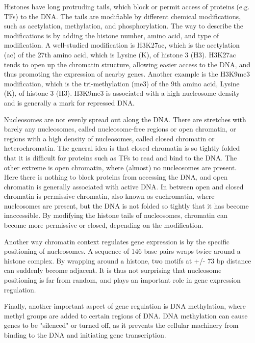 Histones have long protruding tails, which block or permit access of proteins (e.g. TFs) to the DNA. The tails are modifiable by different chemical modifications, such as acetylation, methylation, and phosphorylation. The way to describe the modifications is by adding the histone number, amino acid, and type of modification. A well-studied modification is H3K27ac, which is the acetylation (ac) of the 27th amino acid, which is Lysine (K), of histone 3 (H3). H3K27ac tends to open up the chromatin structure, allowing easier access to the DNA, and thus promoting the expression of nearby genes\cite{Creyghton2010}. Another example is the H3K9me3 modification, which is the tri-methylation (me3) of the 9th amino acid, Lysine (K), of histone 3 (H3). H3K9me3 is associated with a high nucleosome density and is generally a mark for repressed DNA\cite{Barski2007}.

Nucleosomes are not evenly spread out along the DNA. There are stretches with barely any nucleosomes, called nucleosome-free regions or open chromatin, or regions with a high density of nucleosomes, called closed chromatin or heterochromatin. The general idea is that closed chromatin is so tightly folded that it is difficult for proteins such as TFs to read and bind to the DNA. The other extreme is open chromatin, where (almost) no nucleosomes are present. Here there is nothing to block proteins from accessing the DNA, and open chromatin is generally associated with active DNA\cite{Klemm2019}. In between open and closed chromatin is permissive chromatin, also known as euchromatin, where nucleosomes are present, but the DNA is not folded so tightly that it has become inaccessible. By modifying the histone tails of nucleosomes, chromatin can become more permissive or closed, depending on the modification. 

Another way chromatin context regulates gene expression is by the specific positioning of nucleosomes. A sequence of 146 base pairs wraps twice around a histone complex. By wrapping around a histone, two motifs at +/- 73 bp distance can suddenly become adjacent. It is thus not surprising that nucleosome positioning is far from random, and plays an important role in gene expression regulation\cite{Jiang2009}.

Finally, another important aspect of gene regulation is DNA methylation, where methyl groups are added to certain regions of DNA. DNA methylation can cause genes to be "silenced" or turned off, as it prevents the cellular machinery from binding to the DNA and initiating gene transcription.

